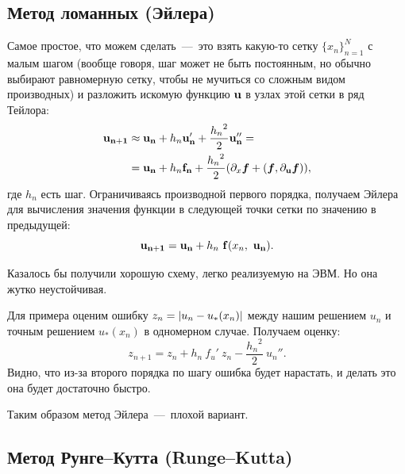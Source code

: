 \documentclass[a4paper,9pt,russian]{article}
\begin{document}
\subsection{Метод ломанных (Эйлера)}
    Самое простое, что можем сделать~---~это взять какую-то сетку $\bigl\{x_n\bigl\}_{n=1}^N$ с малым шагом (вообще говоря, шаг может не быть постоянным, но обычно выбирают равномерную сетку, чтобы не мучиться со сложным видом производных) и разложить искомую функцию ${\bf u}$ в узлах этой сетки в ряд Тейлора: 
\begin{equation}\label{Teylor}
\begin{split}
 {\bf u_{n+1}} & \approx {\bf u_{n}} + h_n{\bf u_{n}'}     +
    \frac{{h_n}^2}{2}{\bf u_{n}''} = \\
    & = {\bf u_{n}} + h_n{\bf f _{n}} + 
    \frac{{h_n}^2}{2}( \partial_x \boldsymbol{f} + (\boldsymbol{f}, \partial_{\bf u}\boldsymbol{f}) ),
\end{split}    
\end{equation}   
	где $h_n$ есть шаг. Ограничиваясь производной первого порядка, получаем { Эйлера} для вычисления значения функции в следующей точки сетки по значению в предыдущей:
    \begin{equation}\label{Eyler}
       {\bf u_{n+1}} = {\bf u_{n}} + h_n\ {\bf f}(x_n,\ {\bf u_{n}}).
    \end{equation}\par
    Казалось бы получили хорошую схему, легко реализуемую на ЭВМ. Но она жутко неустойчивая.\par
    Для примера оценим ошибку $z_n = \abs{u_n - u_*(x_n)}$ между нашим решением $u_n$ и точным решением $u_*(x_n)$ в одномерном случае. Получаем оценку:
    \begin{equation}\label{6}
        z_{n+1} = z_n + h_n\ f_u'\ z_n - \frac{{h_n}^2}{2}\ u_n''.
    \end{equation}
    Видно, что из-за второго порядка по шагу ошибка будет нарастать, и делать это она будет достаточно быстро.\par Таким образом 
    {метод Эйлера~---~плохой вариант}.
\subsection{Метод Рунге--Кутта (Runge--Kutta)}
\end{document}
